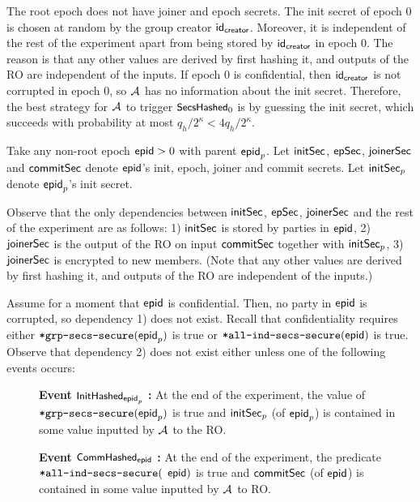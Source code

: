 The root epoch does not have joiner and epoch secrets. The init secret of epoch $0$ is chosen at random by the group creator ${\mathsf{id}}_\mathsf{creator}$. Moreover, it is independent of the rest of the experiment apart from being stored by ${\mathsf{id}}_\mathsf{creator}$ in epoch $0$. The reason is that any other values are derived by first hashing it, and outputs of the RO are independent of the inputs.
If epoch $0$ is confidential, then ${\mathsf{id}}_\mathsf{creator}$ is not corrupted in epoch $0$, so $\mathcal{A}_{\relax}$ has no information about the init secret. Therefore, the best strategy for $\mathcal{A}_{\relax}$ to trigger $\textnormal{\textsf{\small SecsHashed}}_0$ is by guessing the init secret, which succeeds with probability at most $q_h/2^\kappa < 4q_h/2^\kappa$.

Take any non-root epoch ${\normalfont\textsf{epid}}>0$ with parent ${\normalfont\textsf{epid}}_p$. Let ${\mathsf{initSec}}$, ${\mathsf{epSec}}$, ${\mathsf{joinerSec}}$ and ${\mathsf{commitSec}}$ denote ${\normalfont\textsf{epid}}$'s init, epoch, joiner and commit secrets. Let ${\mathsf{initSec}}_p$ denote ${\normalfont\textsf{epid}}_p$'s init secret.

Observe that the only dependencies between ${\mathsf{initSec}}$, ${\mathsf{epSec}}$, ${\mathsf{joinerSec}}$ and the rest of the experiment are as follows: 1) ${\mathsf{initSec}}$ is stored by parties in ${\normalfont\textsf{epid}}$, 2) ${\mathsf{joinerSec}}$ is the output of the RO on input ${\mathsf{commitSec}}$ together with ${\mathsf{initSec}}_p$, 3) ${\mathsf{joinerSec}}$ is encrypted to new members. (Note that any other values are derived by first hashing it, and outputs of the RO are independent of the inputs.)

Assume for a moment that ${\normalfont\textsf{epid}}$ is confidential. Then, no party in ${\normalfont\textsf{epid}}$ is corrupted, so dependency 1) does not exist. Recall that confidentiality requires either ${\textnormal{\tt*grp-secs-secure}}({\normalfont\textsf{epid}}_p)$ is true or ${\textnormal{\tt*all-ind-secs-secure}}({\normalfont\textsf{epid}})$ is true. Observe that dependency 2) does not exist either unless one of the following events occurs:
\begin{description}
  \item[] {\bf Event $\textnormal{\textsf{\small InitHashed}}_{{\normalfont\textsf{epid}}_p}$ : } At the end of the experiment, the value of ${\textnormal{\tt*grp-secs-secure}}({\normalfont\textsf{epid}}_p)$ is true and ${\mathsf{initSec}}_p$ (of ${\normalfont\textsf{epid}}_p$) is contained in some value inputted by $\mathcal{A}_{\relax}$ to the RO.
  \item[] {\bf Event $\textnormal{\textsf{\small CommHashed}}_{{\normalfont\textsf{epid}}}$ : } At the end of the experiment, the predicate ${\textnormal{\tt*all-ind-secs-secure}}($ ${\normalfont\textsf{epid}})$ is true and ${\mathsf{commitSec}}$ (of ${\normalfont\textsf{epid}}$) is contained in some value inputted by $\mathcal{A}_{\relax}$ to RO.
\end{description}

